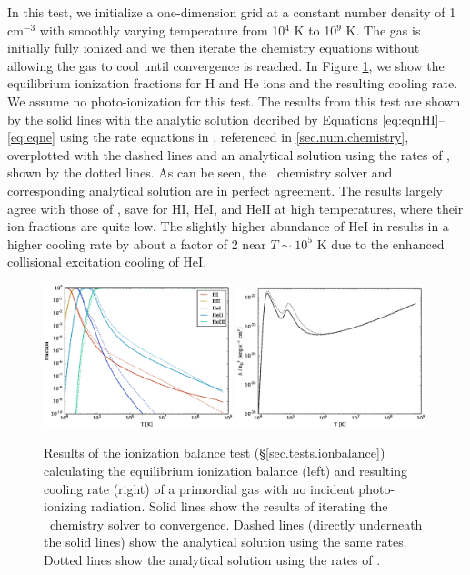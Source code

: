 In this test, we initialize a one-dimension grid at a constant number
density of 1 cm$^{-3}$ with smoothly varying temperature from 10$^{4}$
K to 10$^{9}$ K.  The gas is initially fully ionized and we then
iterate the chemistry equations without allowing the gas to cool until
convergence is reached.  In Figure \ref{fig.eq_test}, we show the
equilibrium ionization fractions for H and He ions and the resulting
cooling rate.  We assume no photo-ionization for this test.  
The results from this test are shown by the solid lines 
with the analytic solution decribed by 
Equations \ref{eq:eqnHI}--\ref{eq:eqne} using the rate equations 
in \enzo, referenced in \s\ref{sec.num.chemistry}, overplotted with
the dashed lines and an analytical solution using the rates 
of \citet{1992ApJS...78..341C}, shown by the dotted lines.  As can be
seen, the \enzo\ chemistry solver and corresponding analytical
solution are in perfect agreement.  The results largely agree with
those of \citet{1992ApJS...78..341C}, save for HI, HeI, and HeII at
high temperatures, where their ion fractions are quite low.  The
slightly higher abundance of HeI in \citet{1992ApJS...78..341C}
results in a higher cooling rate by about a factor of 2 near $T \sim
10^{5}$ K due to the enhanced collisional excitation cooling of HeI.

\begin{figure}
  \begin{center}
    \includegraphics[width=0.49\textwidth]{figures/eq_ionization.eps}
    \includegraphics[width=0.49\textwidth]{figures/eq_cooling.eps}
  \end{center}
  \caption{Results of the ionization balance test
    (\S\ref{sec.tests.ionbalance}) calculating the equilibrium ionization
    balance (left) and resulting cooling rate (right) of a primordial
    gas with no incident photo-ionizing radiation.  Solid lines show
    the results of iterating the \enzo\ chemistry solver to
    convergence.  Dashed lines (directly underneath the solid lines)
    show the analytical solution using the same rates.  Dotted 
    lines show the analytical solution using the rates
    of \citet{1992ApJS...78..341C}.}
  \label{fig.eq_test}
\end{figure}
